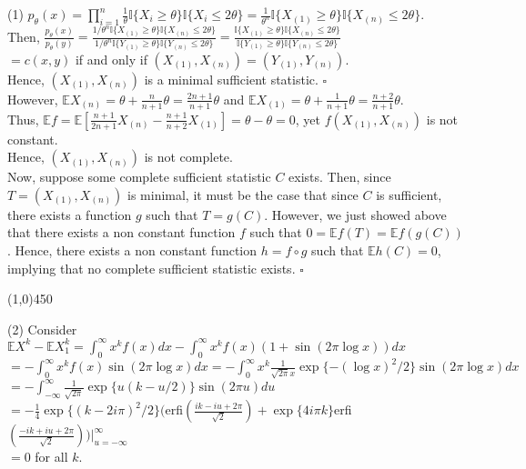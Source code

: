 \documentclass[12pt]{article}
\begin{document}

\def\ci{\perp\!\!\!\perp}
\def\ex{\mathbb{E}}
\def\prob{\mathbb{P}}
\def\ind{\mathbb{I}}
\def\grad{\triangledown}


\noindent
(1) $p_\theta (x) = \prod_{i=1}^n \frac{1}{\theta} \ind\{X_i \geq \theta\}\ind\{X_i \leq 2\theta\}
= \frac{1}{\theta^n} \ind\{X_{(1)} \geq \theta\} \ind\{X_{(n)} \leq 2\theta\}.$\\
Then, $\frac{p_\theta(x)}{p_\theta(y)} = \frac{1/\theta^n \ind\{X_{(1)} \geq \theta\} \ind\{X_{(n)} \leq 2\theta\}}{1/\theta^n \ind\{Y_{(1)} \geq \theta\} \ind\{Y_{(n)} \leq 2\theta\}} =  \frac{ \ind\{X_{(1)}\geq \theta\}\ind\{X_{(n)} \leq 2\theta\}}{\ind\{Y_{(1)} \geq \theta\} \ind\{Y_{(n)} \leq 2\theta\}}$\\
\indent\indent $= c(x,y)$ if and only if $(X_{(1)},X_{(n)}) = (Y_{(1)},Y_{(n)})$.\\
Hence, $(X_{(1)},X_{(n)})$ is a minimal sufficient statistic. $\square$\\

\noindent
However, $\ex X_{(n)} = \theta+\frac{n}{n+1}\theta = \frac{2n+1}{n+1}\theta$ and $\ex X_{(1)} = \theta+\frac{1}{n+1}\theta = \frac{n+2}{n+1}\theta$.\\
Thus, $\ex f = \ex [\frac{n+1}{2n+1}X_{(n)}-\frac{n+1}{n+2}X_{(1)}] = \theta-\theta = 0$, yet $f(X_{(1)},X_{(n)})$ is not constant.\\ Hence, $(X_{(1)},X_{(n)})$ is not complete.\\

\noindent
Now, suppose some complete sufficient statistic $C$ exists. Then, since $T = (X_{(1)},X_{(n)})$ is minimal, it must be the case that since $C$ is sufficient, there exists a function $g$ such that $T=g(C)$. However, we just showed above that there exists a non constant function $f$ such that $0 = \ex f(T) = \ex f(g(C))$. Hence, there exists a non constant function $h = f \circ g$ such that $\ex h(C) = 0$, implying that no complete sufficient statistic exists. $\square$

\begin{center}
\line(1,0){450}
\end{center}


\noindent
(2) Consider $\ex X^k - \ex X_1^k = \int_0^\infty x^k f(x) dx - \int_0^\infty x^k f(x)(1+\sin(2\pi\log x)) dx$\\
\indent $= - \int_0^\infty x^k f(x) \sin(2\pi \log x) dx
= - \int_0^\infty x^k \frac{1}{\sqrt{2\pi}x}\exp\{-(\log x)^2/2\} \sin (2\pi \log x) dx$\\
\indent $= - \int_{-\infty}^\infty \frac{1}{\sqrt{2\pi}}\exp\{u(k-u/2)\}\sin(2\pi u) du$\\
\indent $= -\frac{1}{4}\exp\{(k-2i\pi)^2/2\}($erfi$(\frac{ik-iu+2\pi}{\sqrt{2}})+\exp\{4i\pi k\}$erfi$(\frac{-ik+iu+2\pi}{\sqrt{2}})) \biggr|_{u=-\infty}^\infty$\\
\indent $= 0$ for all $k$. 
\end{document}
